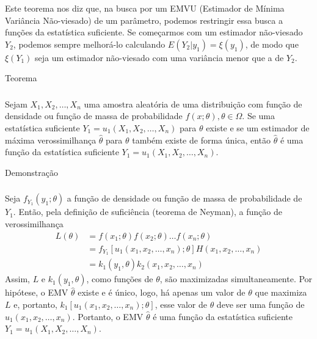 \documentclass[12pt]{beamer}
\begin{document}
\begin{frame}{}
\frametitle{}
\begin{block}{}
\justifying
Este teorema nos diz que, na busca por um EMVU (Estimador de Mínima Variância Não-viesado) de um parâmetro, podemos restringir essa busca a funções da estatística suficiente. Se começarmos com um estimador não-viesado $Y_2$, podemos sempre melhorá-lo calculando $E(Y_2|y_1) = \xi(y_1)$, de modo que $\xi(Y_1)$ seja um estimador não-viesado com uma variância menor que a de $Y_2$.

\end{block}
\end{frame}

\begin{frame}{Teorema}
\frametitle{}
\begin{Teorema}
\justifying
Sejam  $X_1, X_2, \ldots, X_n$  uma amostra aleatória de uma distribuição com função de densidade ou função de massa de probabilidade  $f(x; \theta), \theta \in \Omega.$  Se uma estatística suficiente  $Y_1 = u_1(X_1, X_2, \ldots, X_n)$  para  $\theta$  existe e se um estimador de máxima verossimilhança  $\hat{\theta}$  para  $\theta$  também existe de forma única, então  $\hat{\theta}$  é uma função da estatística suficiente $Y_1 = u_1(X_1, X_2, \ldots, X_n).$
\end{Teorema}
\end{frame}

\begin{frame}{Demonstração}
\frametitle{}
\begin{block}{}
\justifying
Seja $f_{Y_1}(y_1; \theta)$ a função de densidade ou função de massa de probabilidade de $Y_1$. Então, pela definição de suficiência (teorema de Neyman), a função de verossimilhança
\begin{align*}
L(\theta) &= f(x_1; \theta)f(x_2; \theta) \ldots f(x_n; \theta)\\ 
&= f_{Y_1}[u_1(x_1, x_2, \ldots, x_n); \theta]H(x_1, x_2, \ldots, x_n)\\
&=k_{1}(y_{1},\theta)k_{2}(x_1, x_2, \ldots, x_n)
\end{align*}
Assim, $L$ e $k_{1}(y_{1},\theta)$, como funções de $\theta$, são maximizadas simultaneamente. Por hipótese, o EMV $\hat{\theta}$ existe e é único, logo, há apenas um valor de $\theta$ que maximiza $L$ e, portanto, $k_{1}[u_1(x_1, x_2, \ldots, x_n); \theta]$, esse valor de $\theta$ deve ser uma função de $u_1(x_1, x_2, \ldots, x_n)$. Portanto, o EMV $\hat{\theta}$ é uma função da estatística suficiente $Y_1 = u_1(X_1, X_2, \ldots, X_n)$.
\end{block}
\end{frame}
\end{document}
